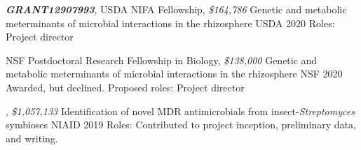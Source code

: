 

\begin{cventries}

\cventry
{\textbf{\textit{GRANT12907993}}, USDA NIFA Fellowship, \textit{\$164,786}}
{Genetic and metabolic meterminants of microbial interactions in the rhizosphere}
{USDA}
{2020}
{Roles: Project director}

\cventry
{NSF Postdoctoral Research Fellowship in Biology, \textit{\$138,000}}
{Genetic and metabolic meterminants of microbial interactions in the rhizosphere}
{NSF}
{2020}
{Awarded, but declined. Proposed roles: Project director}

\cventry
{\textbf{\textit{}}, \textit{\$1,057,133}}
{Identification of novel MDR antimicrobials from insect-\textit{Streptomyces} symbioses}
{NIAID}
{2019}
{Roles: Contributed to project inception, preliminary data, and writing.}

\end{cventries}

